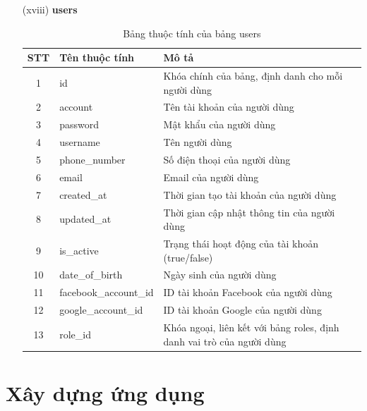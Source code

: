 \documentclass[../DoAn.tex]{subfiles}
\begin{document}
\begin{enumerate}
     \item[(xviii)] \textbf{users}
    \begin{table}[H]
    \centering
        \begin{tabular}{|c|m{4cm}|m{8cm}|}
        \hline
        \textbf{STT} & \textbf{Tên thuộc tính} & \textbf{Mô tả} \\
        \hline
        1 & id & Khóa chính của bảng, định danh cho mỗi người dùng \\
        \hline
        2 & account & Tên tài khoản của người dùng \\
        \hline
        3 & password & Mật khẩu của người dùng \\
        \hline
        4 & username & Tên người dùng \\
        \hline
        5 & phone\_number & Số điện thoại của người dùng \\
        \hline
        6 & email & Email của người dùng \\
        \hline
        7 & created\_at & Thời gian tạo tài khoản của người dùng \\
        \hline
        8 & updated\_at & Thời gian cập nhật thông tin của người dùng \\
        \hline
        9 & is\_active & Trạng thái hoạt động của tài khoản (true/false) \\
        \hline
        10 & date\_of\_birth & Ngày sinh của người dùng \\
        \hline
        11 & facebook\_account\_id & ID tài khoản Facebook của người dùng \\
        \hline
        12 & google\_account\_id & ID tài khoản Google của người dùng \\
        \hline
        13 & role\_id & Khóa ngoại, liên kết với bảng roles, định danh vai trò của người dùng \\
        \hline
        \end{tabular}
        \caption{Bảng thuộc tính của bảng users}
        \label{tab:users_attributes}
    \end{table}

\end{enumerate}



\section{Xây dựng ứng dụng}
\end{document}
